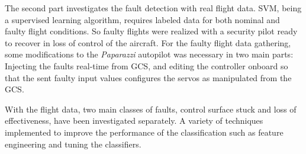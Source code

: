 The second part investigates the fault detection with real flight data. 
SVM, being a supervised learning algorithm, requires labeled data for both nominal and faulty flight conditions. 
So faulty flights were realized with a security pilot ready to recover in loss of control of the aircraft.
For the faulty flight data gathering, some modifications to the \emph{Paparazzi} autopilot was necessary in two main parts: Injecting the faults real-time from GCS, and editing the controller onboard so that the sent faulty input values configures the servos as manipulated from the GCS. 

With the flight data, two main classes of faults, control surface stuck and loss of effectiveness, have been investigated separately. 
A variety of techniques implemented to improve the performance of the classification such as feature engineering and tuning the classifiers. 

